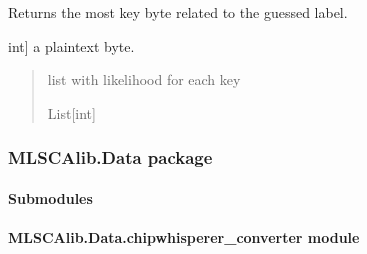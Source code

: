 \documentclass[letterpaper,10pt,english]{sphinxmanual}
\begin{document}
\begin{fulllineitems}
\begin{fulllineitems}
\label{\detokenize{MLSCAlib.Ciphers:MLSCAlib.Ciphers.leakage_model.LeakageModel.recover_key_byte_hypothesis}}
\pysigstartsignatures
{}
\pysigstopsignatures
\sphinxAtStartPar
Returns the most key byte related to the guessed label.
\begin{description}
\sphinxlineitem{plaintext\_i}{[}int{]}
\sphinxAtStartPar
a plaintext byte.

\end{description}
\begin{quote}\begin{description}
\sphinxAtStartPar
list with likelihood for each key

\sphinxAtStartPar
List{[}int{]}

\end{description}\end{quote}

\end{fulllineitems}


\end{fulllineitems}


\sphinxstepscope


\subsubsection{MLSCAlib.Data package}
\label{\detokenize{MLSCAlib.Data:mlscalib-data-package}}\label{\detokenize{MLSCAlib.Data::doc}}

\paragraph{Submodules}
\label{\detokenize{MLSCAlib.Data:submodules}}

\paragraph{MLSCAlib.Data.chipwhisperer\_converter module}
\label{\detokenize{MLSCAlib.Data:module-MLSCAlib.Data.chipwhisperer_converter}}\label{\detokenize{MLSCAlib.Data:mlscalib-data-chipwhisperer-converter-module}}
\end{document}
